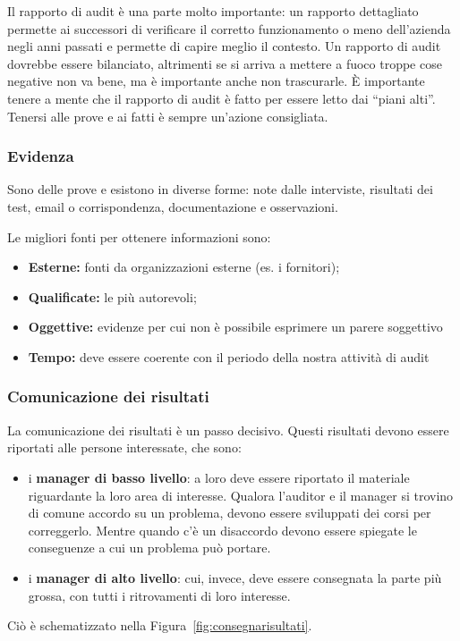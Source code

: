 Il rapporto di audit è una parte molto importante: un rapporto dettagliato
permette ai successori di verificare il corretto funzionamento o meno
dell'azienda negli anni passati e permette di capire meglio il contesto. Un
rapporto di audit dovrebbe essere bilanciato, altrimenti se si arriva a mettere
a fuoco troppe cose negative non va bene, ma è importante anche non trascurarle.
È importante tenere a mente che il rapporto di audit è fatto per essere letto
dai ``piani alti''. Tenersi alle prove e ai fatti è sempre un'azione
consigliata.

\subsubsection{Evidenza}

Sono delle prove e esistono in diverse forme: note dalle interviste, risultati
dei test, email o corrispondenza, documentazione e osservazioni.

Le migliori fonti per ottenere informazioni sono:
\begin{itemize}
  \item \textbf{Esterne:} fonti da organizzazioni esterne (es. i fornitori);
  \item \textbf{Qualificate:} le più autorevoli;
  \item \textbf{Oggettive:} evidenze per cui non è possibile esprimere un
  parere soggettivo
  \item \textbf{Tempo:} deve essere coerente con il periodo della nostra
  attività di audit
\end{itemize}

\subsubsection{Comunicazione dei risultati}

La comunicazione dei risultati è un passo decisivo. Questi risultati devono
essere riportati alle persone interessate, che sono:
\begin{itemize}
  \item i \textbf{manager di basso livello}: a loro deve essere riportato il
  materiale riguardante la loro area di interesse.
  Qualora l'auditor e il manager si trovino di comune accordo su un problema,
  devono essere sviluppati dei corsi per correggerlo.
  Mentre quando c'è un disaccordo devono essere
  spiegate le conseguenze a cui un problema può portare.
  \item i \textbf{manager di alto livello}: cui, invece, deve essere
  consegnata la parte più grossa, con tutti i ritrovamenti di
  loro interesse.
\end{itemize}
Ciò è schematizzato nella Figura~\ref{fig:consegnarisultati}.



